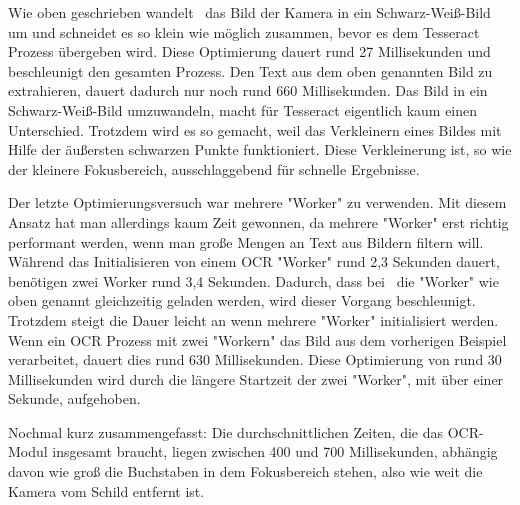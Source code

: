 Wie oben geschrieben wandelt \ZELIA\ das Bild der Kamera in ein Schwarz-Weiß-Bild um und schneidet es so klein wie möglich zusammen, bevor es dem Tesseract Prozess übergeben wird. Diese Optimierung dauert rund 27 Millisekunden und beschleunigt den gesamten Prozess. Den Text aus dem oben genannten Bild zu extrahieren, dauert dadurch nur noch rund 660 Millisekunden. Das Bild in ein Schwarz-Weiß-Bild umzuwandeln, macht für Tesseract eigentlich kaum einen Unterschied. Trotzdem wird es so gemacht, weil das Verkleinern eines Bildes mit Hilfe der äußersten schwarzen Punkte funktioniert. Diese Verkleinerung ist, so wie der kleinere Fokusbereich, ausschlaggebend für schnelle Ergebnisse. 

Der letzte Optimierungsversuch war mehrere "Worker" zu verwenden. Mit diesem Ansatz hat man allerdings kaum Zeit gewonnen, da mehrere "Worker" erst richtig performant werden, wenn man große Mengen an Text aus Bildern filtern will. Während das Initialisieren von einem OCR "Worker" rund 2,3 Sekunden dauert, benötigen zwei Worker rund 3,4 Sekunden. Dadurch, dass bei \ZELIA\ die "Worker" wie oben genannt gleichzeitig geladen werden, wird dieser Vorgang beschleunigt. Trotzdem steigt die Dauer leicht an wenn mehrere "Worker" initialisiert werden. Wenn ein OCR Prozess mit zwei "Workern" das Bild aus dem vorherigen Beispiel verarbeitet, dauert dies rund 630 Millisekunden. Diese Optimierung von rund 30 Millisekunden wird durch die längere Startzeit der zwei "Worker", mit über einer Sekunde, aufgehoben.

Nochmal kurz zusammengefasst: Die durchschnittlichen Zeiten, die das OCR-Modul insgesamt braucht, liegen zwischen 400 und 700 Millisekunden, abhängig davon wie groß die Buchstaben in dem Fokusbereich stehen, also wie weit die Kamera vom Schild entfernt ist.

